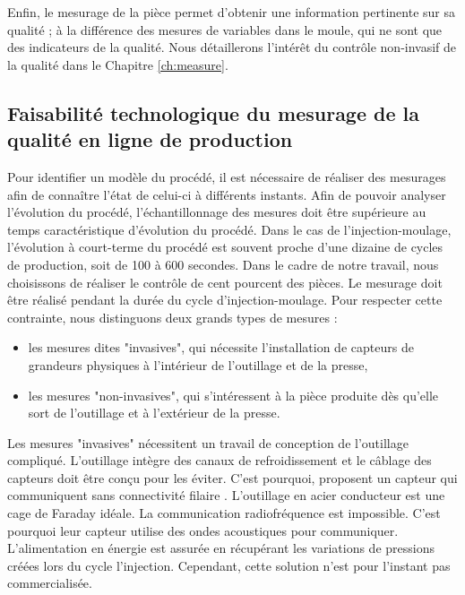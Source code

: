 Enfin, le mesurage de la pièce permet d'obtenir une information pertinente sur sa qualité ; à la différence des mesures de variables dans le moule, qui ne sont que des indicateurs de la qualité.
Nous détaillerons l'intérêt du contrôle non-invasif de la qualité dans le Chapitre \ref{ch:measure}.

\subsection{Faisabilité technologique du mesurage de la qualité en ligne de production}
Pour identifier un modèle du procédé, il est nécessaire de réaliser des mesurages afin de connaître l'état de celui-ci à différents instants.  %
Afin de pouvoir analyser l'évolution du procédé, l'échantillonnage des mesures doit être supérieure au temps caractéristique d'évolution du procédé.
Dans le cas de l'injection-moulage, l'évolution à court-terme du procédé est souvent proche d'une dizaine de cycles de production, soit de 100 à 600 secondes.  %
Dans le cadre de notre travail, nous choisissons de réaliser le contrôle de cent pourcent des pièces.
Le mesurage doit être réalisé pendant la durée du cycle d'injection-moulage.
Pour respecter cette contrainte, nous distinguons deux grands types de mesures :
\begin{itemize}
\item les mesures dites "invasives", qui nécessite l'installation de capteurs de grandeurs physiques à l'intérieur de l'outillage et de la presse,
\item les mesures "non-invasives", qui s'intéressent à la pièce produite dès qu'elle sort de l'outillage et à l'extérieur de la presse.
\end{itemize}


Les mesures "invasives" nécessitent un travail de conception de l'outillage compliqué.
L'outillage intègre des canaux de refroidissement et le câblage des capteurs doit être conçu pour les éviter.
C'est pourquoi, \citeauthor{gao_multivariate_2012} proposent un capteur qui communiquent sans connectivité filaire \cite{kazmer_feasibility_2011, gao_multivariate_2012}.
L'outillage en acier conducteur est une cage de Faraday idéale.
La communication radiofréquence  est impossible.
C'est pourquoi leur capteur utilise des ondes acoustiques pour communiquer.
L'alimentation en énergie est assurée en récupérant les variations de pressions créées lors du cycle l'injection.
Cependant, cette solution n'est pour l'instant pas commercialisée.

